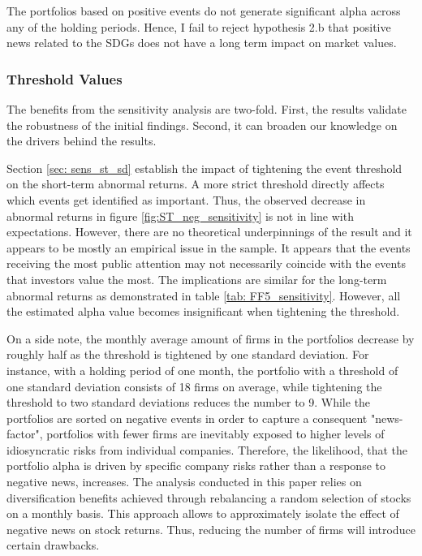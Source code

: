 The portfolios based on positive events do not generate significant alpha across any of the holding periods. Hence, I fail to reject hypothesis 2.b that positive news related to the SDGs does not have a long term impact on market values.


\subsubsection{Threshold Values}

The benefits from the sensitivity analysis are two-fold. First, the results validate the robustness of the initial findings. Second, it can broaden our knowledge on the drivers behind the results. 

Section \ref{sec: sens_st_sd} establish the impact of tightening the event threshold on the short-term abnormal returns. A more strict threshold directly affects which events get identified as important. Thus, the observed decrease in abnormal returns in figure \ref{fig:ST_neg_sensitivity} is not in line with expectations. However, there are no theoretical underpinnings of the result and it appears to be mostly an empirical issue in the sample. It appears that the events receiving the most public attention may not necessarily coincide with the events that investors value the most. 
The implications are similar for the long-term abnormal returns as demonstrated in table \ref{tab: FF5_sensitivity}. However, all the estimated alpha value becomes insignificant when tightening the threshold. 

On a side note, the monthly average amount of firms in the portfolios decrease by roughly half as the threshold is tightened by one standard deviation. For instance, with a holding period of one month, the portfolio with a threshold of one standard deviation consists of 18 firms on average, while tightening the threshold to two standard deviations reduces the number to 9. While the portfolios are sorted on negative events in order to capture a consequent "news-factor", portfolios with fewer firms are inevitably exposed to higher levels of idiosyncratic risks from individual companies. Therefore, the likelihood, that the portfolio alpha is driven by specific company risks rather than a response to negative news, increases. The analysis conducted in this paper relies on diversification benefits achieved through rebalancing a random selection of stocks on a monthly basis. This approach allows to approximately isolate the effect of negative news on stock returns. Thus, reducing the number of firms will introduce certain drawbacks. 

